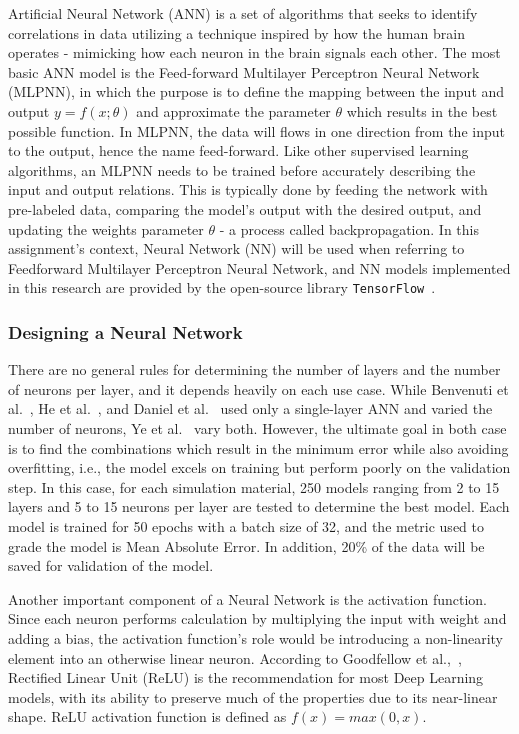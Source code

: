 Artificial Neural Network (ANN) is a set of algorithms that seeks to identify correlations in data utilizing a technique inspired by how the human brain operates - mimicking how each neuron in the brain signals each other. The most basic ANN model is the Feed-forward Multilayer Perceptron Neural Network (MLPNN), in which the purpose is to define the mapping between the input and output \(y = f(x;\theta)\) and approximate the parameter \(\theta\) which results in the best possible function. In MLPNN, the data will flows in one direction from the input to the output, hence the name feed-forward. Like other supervised learning algorithms, an MLPNN needs to be trained before accurately describing the input and output relations. This is typically done by feeding the network with pre-labeled data, comparing the model's output with the desired output, and updating the weights parameter \(\theta\) - a process called backpropagation. In this assignment's context, Neural Network (NN) will be used when referring to Feedforward Multilayer Perceptron Neural Network, and NN models implemented in this research are provided by the open-source library \texttt{TensorFlow}~\cite{tensorflow2015-whitepaper}.

\subsubsection{Designing a Neural Network}

There are no general rules for determining the number of layers and the number of neurons per layer, and it depends heavily on each use case. While Benvenuti et al.~\cite{nn-calibration}, He et al.~\cite{NN-GA}, and Daniel et al.~\cite{NN-coarse} used only a single-layer ANN and varied the number of neurons, Ye et al.~\cite{YE2019292} vary both. However, the ultimate goal in both case is to find the combinations which result in the minimum error while also avoiding overfitting, i.e., the model excels on training but perform poorly on the validation step. In this case, for each simulation material, 250 models ranging from 2 to 15 layers and 5 to 15 neurons per layer are tested to determine the best model. Each model is trained for 50 epochs with a batch size of 32, and the metric used to grade the model is Mean Absolute Error. In addition, 20\% of the data will be saved for validation of the model. 

Another important component of a Neural Network is the activation function. Since each neuron performs calculation by multiplying the input with weight and adding a bias, the activation function's role would be introducing a non-linearity element into an otherwise linear neuron. According to Goodfellow et al.,~\cite{DL-Goodfellow}, Rectified Linear Unit (ReLU) is the recommendation for most Deep Learning models, with its ability to preserve much of the properties due to its near-linear shape. ReLU activation function is defined as $f(x) = max(0, x)$. 

